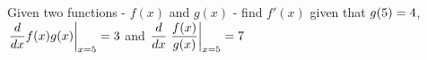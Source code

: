 
%
%
%
%      
% 
% 
%   



\SQUARE\vbtwo\tp
\gcalcexpr[0]\tq{\vbfour * \tp}
\ADD\tq\vbthree\tr
\MULTIPLY{}\ts

\question[3] Given two functions - $f(x)$ and $g(x)$ - find $f'(x)$ given that 
$g(5) = 4$, $\left.\dfrac{d}{dx} f(x)g(x)\right\vert_{x=5} = 3$ and 
$\dfrac{d}{dx}\left.\dfrac{f(x)}{g(x)}\right\vert_{x=5} = 7$

